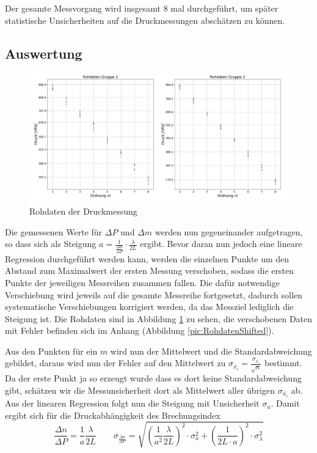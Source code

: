 \documentclass[a4paper, 11pt]{article}
\begin{document}
Der gesamte Messvorgang wird insgesamt 8 mal durchgeführt, um später statistische Unsicherheiten auf die Druckmessungen abschätzen zu können.

\subsection{Auswertung}
\begin{figure}[H]
	\centering
	\includegraphics[scale=0.35]{./Bilder/Rohdaten.png}
	\caption{Rohdaten der Druckmessung}
	\label{pic:DruckmessungRoh}	
\end{figure}

Die gemessenen Werte für $\Delta P$ und $\Delta m$ werden nun gegeneinander aufgetragen, so dass sich als Steigung $a=\frac{1}{\frac{\Delta n}{\Delta P}} \cdot \frac{\lambda}{2L}$ ergibt. Bevor daran nun jedoch eine lineare Regression durchgeführt werden kann,  werden die einzelnen Punkte um den Abstand zum Maximalwert der ersten Messung verschoben, sodass die ersten Punkte der jeweiligen Messreihen zusammen fallen. Die dafür notwendige Verschiebung wird jeweils auf die gesamte Messreihe fortgesetzt, dadurch sollen systematische Verschiebungen korrigiert werden, da das Messziel lediglich die Steigung ist. Die Rohdaten sind in Abbildung \ref{pic:DruckmessungRoh} zu sehen, die verschobenen Daten mit Fehler befinden sich im Anhang (Abbildung \ref{pic:RohdatenShifted}).

Aus den Punkten für ein $m$ wird nun der Mittelwert und die Standardabweichung gebildet, daraus wird nun der Fehler auf den Mittelwert zu $\sigma_{\bar{x_i}}=\frac{\sigma_{x_i}}{\sqrt{n}}$ bestimmt. Da der erste Punkt ja so erzeugt wurde dass es dort keine Standardabweichung gibt, schätzen wir die Messunsicherheit dort als Mittelwert aller übrigen $\sigma_{\bar{x_i}}$ ab. Aus der linearen Regression folgt nun die Steigung mit Unsicherheit $\sigma_a$. Damit ergibt sich für die Druckabhängigkeit des Brechungsindex
\begin{equation}
\frac{\Delta n}{\Delta P}=\frac{1}{a}\frac{\lambda}{2L} 
\qquad
\sigma_{\frac{\Delta n}{\Delta P}} = \sqrt{\left(\frac{1}{a^2} \frac{\lambda}{2L}\right)^2 \cdot \sigma_a^2 + \left(\frac{1}{2L \cdot a}\right)^2 \cdot \sigma_{\lambda}^2}
\end{equation}
\end{document}
